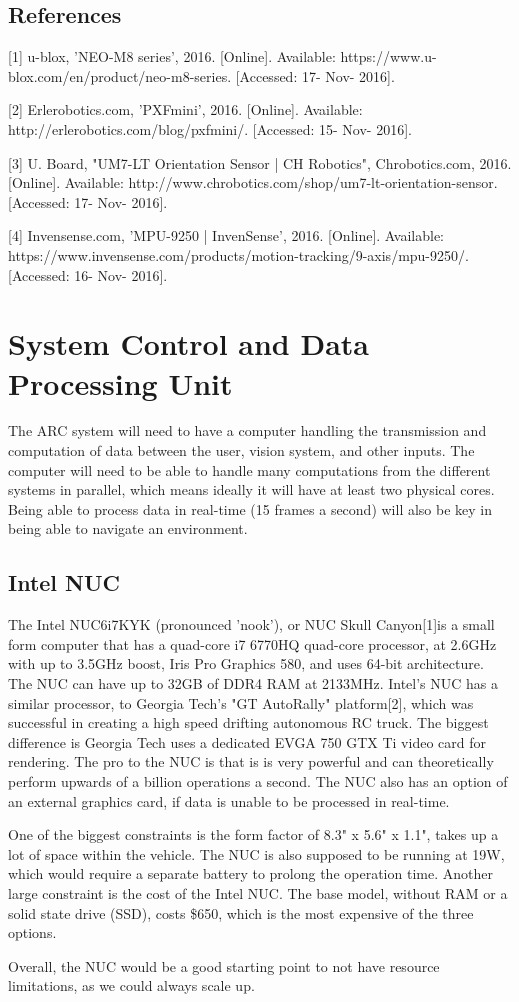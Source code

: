 \documentclass[compsoc,draftclsnofoot,onecolumn,10pt]{IEEEtran}
\begin{document}
\subsection{References}
[1] u-blox, 'NEO-M8 series',  2016. [Online]. Available: https://www.u-blox.com/en/product/neo-m8-series. [Accessed: 17- Nov- 2016].

[2] Erlerobotics.com, 'PXFmini',  2016. [Online]. Available: http://erlerobotics.com/blog/pxfmini/. [Accessed: 15- Nov- 2016].

[3] U. Board, "UM7-LT Orientation Sensor | CH Robotics", Chrobotics.com, 2016. [Online]. Available: http://www.chrobotics.com/shop/um7-lt-orientation-sensor. [Accessed: 17- Nov- 2016].

[4] Invensense.com, 'MPU-9250 | InvenSense', 2016. [Online]. Available: https://www.invensense.com/products/motion-tracking/9-axis/mpu-9250/. [Accessed: 16- Nov- 2016].


\newpage
\section{System Control and Data Processing Unit}
The ARC system will need to have a computer handling the transmission and computation of data between the user, vision system, and other inputs. 
The computer will need to be able to handle many computations from the different systems in parallel, which means ideally it will have at least two physical cores. 
Being able to process data in real-time (15 frames a second) will also be key in being able to navigate an environment. 

\subsection{Intel NUC}
The Intel NUC6i7KYK (pronounced 'nook'), or NUC Skull Canyon[1]is a small form computer that has a quad-core i7 6770HQ quad-core processor, at 2.6GHz with up to 3.5GHz boost, Iris Pro Graphics 580, and uses 64-bit architecture. 
The NUC can have up to 32GB of DDR4 RAM at 2133MHz. 
Intel's NUC has a similar processor, to Georgia Tech's "GT AutoRally" platform[2], which was successful in creating a high speed drifting autonomous RC truck. 
The biggest difference is Georgia Tech uses a dedicated EVGA 750 GTX Ti video card for rendering.
The pro to the NUC is that is is very powerful and can theoretically perform upwards of a billion operations a second. 
The NUC also has an option of an external graphics card, if data is unable to be processed in real-time. \par
One of the biggest constraints is the form factor of 8.3" x 5.6" x 1.1", takes up a lot of space within the vehicle.
The NUC is also supposed to be running at 19W, which would require a separate battery to prolong the operation time. 
Another large constraint is the cost of the Intel NUC. 
The base model, without RAM or a solid state drive (SSD), costs \$650, which is the most expensive of the three options. \par
Overall, the NUC would be a good starting point to not have resource limitations, as we could always scale up. 
\end{document}
